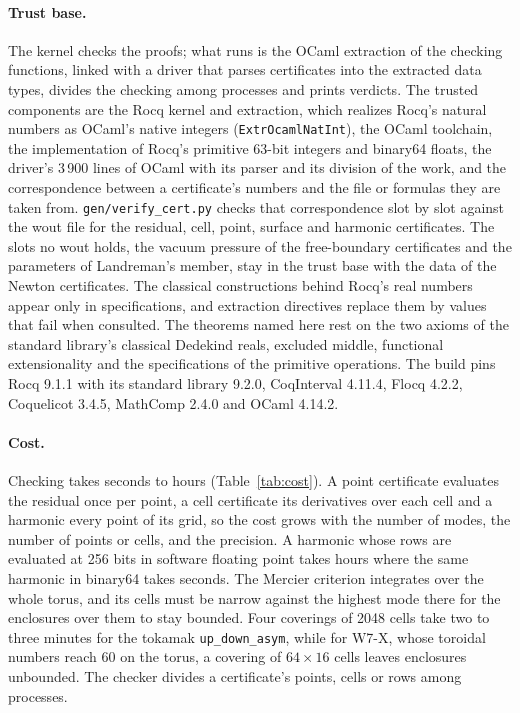 \documentclass[11pt]{article}
\newcommand{\code}[1]{\texttt{#1}}
\begin{document}
\paragraph{Trust base.}
The kernel checks the proofs; what runs is the OCaml extraction of the checking
functions, linked with a driver that parses certificates into the extracted data
types, divides the checking among processes and prints verdicts. The trusted
components are the Rocq kernel and extraction, which realizes Rocq's natural
numbers as OCaml's native integers (\code{ExtrOcamlNatInt}), the OCaml
toolchain, the implementation of Rocq's primitive 63-bit integers and binary64
floats, the driver's 3\,900 lines of OCaml with its parser and its division of
the work, and the correspondence between a certificate's numbers and the file
or formulas they are taken from. \code{gen/verify\_cert.py} checks that
correspondence slot by slot against the wout file for the residual, cell,
point, surface and harmonic certificates. The slots no wout holds, the vacuum
pressure of the free-boundary certificates and the parameters of Landreman's
member, stay in the trust base with the data of the Newton certificates. The
classical constructions behind Rocq's real numbers appear only in
specifications, and extraction directives replace them by values that fail
when consulted. The theorems named here rest on the
two axioms of the standard library's classical Dedekind reals, excluded middle,
functional extensionality and the specifications of the primitive operations.
The build pins Rocq 9.1.1 with its
standard library 9.2.0, CoqInterval 4.11.4, Flocq 4.2.2, Coquelicot 3.4.5,
MathComp 2.4.0 and OCaml 4.14.2.

\paragraph{Cost.}
Checking takes seconds to hours (Table~\ref{tab:cost}). A point
certificate evaluates the residual once per point, a cell certificate its
derivatives over each cell and a harmonic every point of its grid, so the cost
grows with the number of modes, the number of points or cells, and the
precision. A harmonic whose rows are evaluated at 256 bits in software floating
point takes hours where the same harmonic in binary64 takes seconds. The
Mercier criterion integrates over the whole torus, and its cells must be narrow
against the highest mode there for the enclosures over them to stay bounded.
Four coverings of 2048 cells take two to three minutes for the tokamak
\code{up\_down\_asym}, while for W7-X, whose toroidal numbers reach 60 on the
torus, a covering of $64\times16$ cells leaves enclosures unbounded. The
checker divides a certificate's points, cells or rows among processes.
\end{document}
